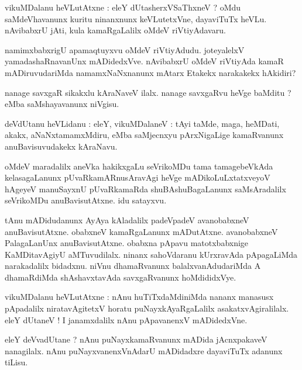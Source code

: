 \documentclass{article}
\begin{document}
\begin{mn}
vikuMDalanu heVLutAtxne : eleY dUtasherxVSaThxneV ? oMdu saMdeVhavanunx kuritu ninanxnunx 
keVLutetxVne, dayaviTuTx heVLu. nAvibabxrU jAti, kula kamaRgaLalilx oMdeV riVtiyAdavaru.
\end{mn}

\begin{mn}
namimxbabxrigU apamaqtuyxvu oMdeV riVtiyAdudu. joteyalelxV yamadashaRnavanUnx mADidedxVve. 
nAvibabxrU oMdeV riVtiyAda kamaR mADiruvudariMda namamxNaNxnanunx mAtarx Etakekx narakakekx 
hAkidiri?
\end{mn}

\begin{mn}
nanage savxgaR sikakxlu kAraNaveV ilalx. nanage savxgaRvu heVge baMditu ? eMba saMshayavanunx 
niVgisu.
\end{mn}

\begin{mn}
deVdUtanu heVLidanu : eleY, vikuMDalaneV : tAyi taMde, maga, heMDati, akakx, aNaNxtamamxMdiru, 
eMba saMjecnxyu pArxNigaLige kamaRvanunx anuBavisuvudakekx kAraNavu.
\end{mn}

\begin{mn}
oMdeV maradalilx aneVka hakikxgaLu seVrikoMDu tama tamagebeVkAda kelasagaLanunx 
pUvaRkamARnusAravAgi heVge mADikoLuLxtatxveyoV hAgeyeV manuSayxnU pUvaRkamaRda shuBAshuBagaLanunx 
saMsAradalilx seVrikoMDu anuBavisutAtxne. idu satayxvu.
\end{mn}

\begin{mn}
tAnu mADidudanunx AyAya kAladalilx padeVpadeV avanobabxneV anuBavisutAtxne. obabxneV 
kamaRgaLanunx mADutAtxne. avanobabxneV PalagaLanUnx anuBavisutAtxne. obabxna pApavu 
matotxbabxnige KaMDitavAgiyU aMTuvudilalx. ninanx sahoVdaranu kUrxravAda pApagaLiMda narakadalilx 
bidadxnu. niVnu dhamaRvanunx balalxvanAdudariMda A dhamaRdiMda shAshavxtavAda savxgaRvanunx 
hoMdididxVye.
\end{mn}

\begin{mn}
vikuMDalanu heVLutAtxne : nAnu huTiTxdaMdiniMda nananx manasusx pApadalilx niratavAgitetxV horatu 
puNayxkAyaRgaLalilx asakatxvAgiralilalx. eleY dUtaneV ! I janamxdalilx nAnu pApavanenxV mADidedxVne.
\end{mn}

\begin{mn}
eleY deVvadUtane ? nAnu puNayxkamaRvanunx mADida jAcnxpakaveV nanagilalx. nAnu puNayxvanenxVnAdarU 
mADidadxre dayaviTuTx adanunx tiLisu.
\end{mn}
\end{document}
